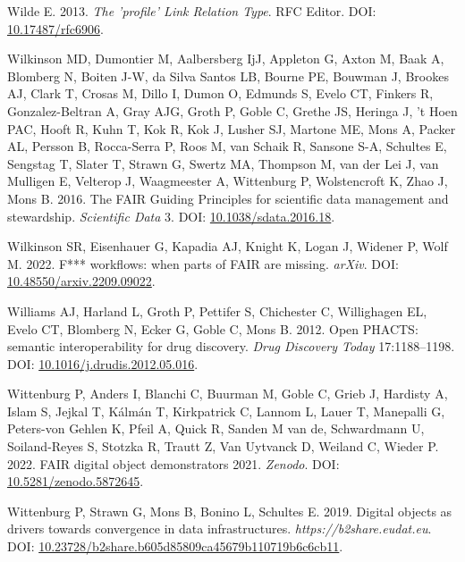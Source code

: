 \begin{CSLReferences}{1}{0}
\leavevmode{}%
Wilde E. 2013. \emph{The 'profile' Link Relation Type}. RFC Editor. DOI: \href{https://doi.org/10.17487/rfc6906}{10.17487/rfc6906}.

\leavevmode{}%
Wilkinson MD, Dumontier M, Aalbersberg IjJ, Appleton G, Axton M, Baak A, Blomberg N, Boiten J-W, da Silva Santos LB, Bourne PE, Bouwman J, Brookes AJ, Clark T, Crosas M, Dillo I, Dumon O, Edmunds S, Evelo CT, Finkers R, Gonzalez-Beltran A, Gray AJG, Groth P, Goble C, Grethe JS, Heringa J, 't Hoen PAC, Hooft R, Kuhn T, Kok R, Kok J, Lusher SJ, Martone ME, Mons A, Packer AL, Persson B, Rocca-Serra P, Roos M, van Schaik R, Sansone S-A, Schultes E, Sengstag T, Slater T, Strawn G, Swertz MA, Thompson M, van der Lei J, van Mulligen E, Velterop J, Waagmeester A, Wittenburg P, Wolstencroft K, Zhao J, Mons B. 2016. The FAIR Guiding Principles for scientific data management and stewardship. \emph{Scientific Data} 3. DOI: \href{https://doi.org/10.1038/sdata.2016.18}{10.1038/sdata.2016.18}.

\leavevmode{}%
Wilkinson SR, Eisenhauer G, Kapadia AJ, Knight K, Logan J, Widener P, Wolf M. 2022. F*** workflows: when parts of FAIR are missing. \emph{arXiv}. DOI: \href{https://doi.org/10.48550/arxiv.2209.09022}{10.48550/arxiv.2209.09022}.

\leavevmode{}%
Williams AJ, Harland L, Groth P, Pettifer S, Chichester C, Willighagen EL, Evelo CT, Blomberg N, Ecker G, Goble C, Mons B. 2012. Open PHACTS: semantic interoperability for drug discovery. \emph{Drug Discovery Today} 17:1188--1198. DOI: \href{https://doi.org/10.1016/j.drudis.2012.05.016}{10.1016/j.drudis.2012.05.016}.

\leavevmode{}%
Wittenburg P, Anders I, Blanchi C, Buurman M, Goble C, Grieb J, Hardisty A, Islam S, Jejkal T, Kálmán T, Kirkpatrick C, Lannom L, Lauer T, Manepalli G, Peters-von Gehlen K, Pfeil A, Quick R, Sanden M van de, Schwardmann U, Soiland-Reyes S, Stotzka R, Trautt Z, Van Uytvanck D, Weiland C, Wieder P. 2022. FAIR digital object demonstrators 2021. \emph{Zenodo}. DOI: \href{https://doi.org/10.5281/zenodo.5872645}{10.5281/zenodo.5872645}.

\leavevmode{}%
Wittenburg P, Strawn G, Mons B, Bonino L, Schultes E. 2019. Digital objects as drivers towards convergence in data infrastructures. \emph{https://b2share.eudat.eu}. DOI: \href{https://doi.org/10.23728/b2share.b605d85809ca45679b110719b6c6cb11}{10.23728/b2share.b605d85809ca45679b110719b6c6cb11}.


\end{CSLReferences}
